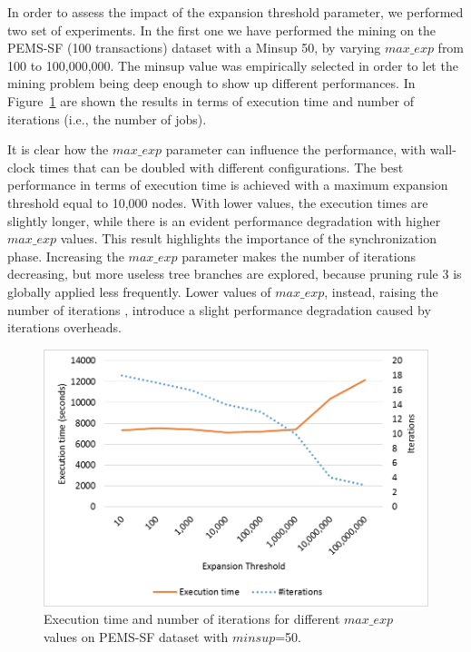 In order to assess the impact of the expansion threshold parameter, we performed two set of experiments. In the first one we have performed the mining on the PEMS-SF (100 transactions) dataset with a Minsup 50, by varying $max\_exp$ from 100 to 100,000,000.  The minsup value was empirically selected in order to let the mining problem being deep enough to show up different performances. 
In Figure~\ref{pems_fixed} are shown the results in terms of execution time and number of iterations 
(i.e., the number of jobs).

It is clear how the $max\_exp$ parameter can influence the performance, with wall-clock times that can be doubled with different configurations. The best performance in terms of execution time is achieved with a maximum
expansion threshold equal to 10,000 nodes. With lower values, the execution times are slightly longer, while there is an evident performance degradation with higher $max\_exp$ values. 
This result highlights the importance of the synchronization phase.
Increasing the $max\_exp$ parameter makes the number of iterations decreasing,
but more useless tree branches are explored,
because pruning rule 3 is globally applied less frequently.
Lower values of  $max\_exp$, instead, raising the number of iterations
, introduce a slight performance
degradation caused by iterations overheads.

\begin{figure}[!t]
\includegraphics[width=5in]{immagini_extension/pems_fixed.png}
\caption{Execution time and number of iterations for different $max\_exp$ values on PEMS-SF dataset with $minsup$=50.
}
\label{pems_fixed}
\end{figure}

